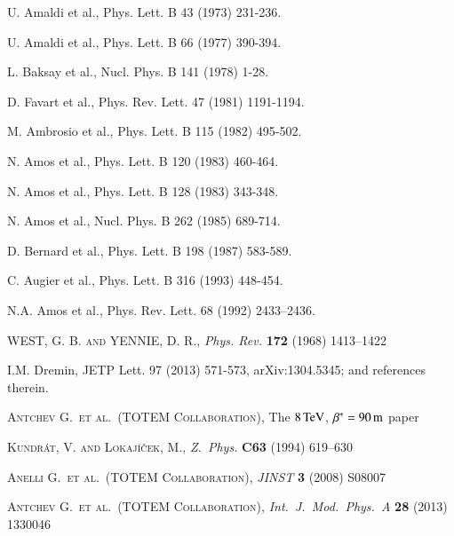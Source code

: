 \documentclass[3p,onecolumn,12pt,times,longtitle]{elsarticle}
\def\un#1{\,{\rm #1}}
\def\etal{et al.}
\def\Name#1{\textsc{#1}, }
\def\REVIEW#1#2#3#4{{\it #1} {\bf #2} (#3) #4}
\begin{document}
\begin{thebibliography}{99}


 U. Amaldi et al., Phys. Lett. B 43 (1973) 231-236.

 U. Amaldi et al., Phys. Lett. B 66 (1977) 390-394.

 L. Baksay et al., Nucl. Phys. B 141 (1978) 1-28.

 D. Favart et al., Phys. Rev. Lett. 47 (1981) 1191-1194.

 M. Ambrosio et al., Phys. Lett. B 115 (1982) 495-502.

 N. Amos et al., Phys. Lett. B 120 (1983) 460-464.

 N. Amos et al., Phys. Lett. B 128 (1983) 343-348.

 N. Amos et al., Nucl. Phys. B 262 (1985) 689-714.

 D. Bernard et al., Phys. Lett. B 198 (1987) 583-589.

 C. Augier et al., Phys. Lett. B 316 (1993) 448-454.

 N.A. Amos et al., Phys. Rev. Lett. 68 (1992) 2433–2436.


	\Name{WEST, G. B. and YENNIE, D. R.}
	\REVIEW{Phys. Rev.}{172}{1968}{1413--1422}

 I.M. Dremin, JETP Lett. 97 (2013) 571-573, arXiv:1304.5345; and references therein.

	\Name{Antchev G.~\etal{}~(TOTEM Collaboration)}
	The $8\un{TeV}$, $\beta^* = 90\un{m}$ paper

	\Name{Kundr\' at, V. and Lokaj\' i\v cek, M.}
	\REVIEW{Z.~Phys.}{C63}{1994}{619--630}


	\Name{Anelli G.~\etal{}~(TOTEM Collaboration)}
	\REVIEW{JINST}{3}{2008}{S08007}

	\Name{Antchev G.~\etal{}~(TOTEM Collaboration)}
	\REVIEW{Int.~J.~Mod.~Phys.~A}{28}{2013}{1330046}



\end{thebibliography}
\end{document}

